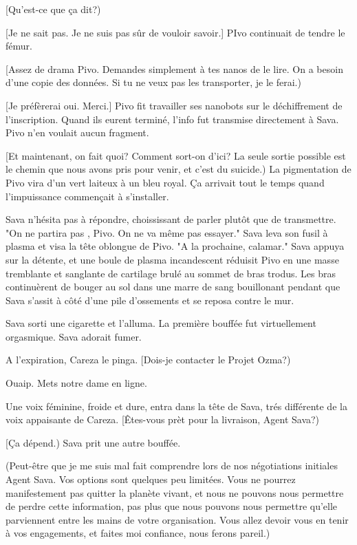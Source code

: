 [Qu'est-ce que ça dit?) 

[Je ne sait pas. Je ne suis pas sûr de vouloir savoir.] PIvo continuait de tendre le fémur. 

[Assez de drama Pivo. Demandes simplement à tes nanos de le lire. On a besoin d'une copie des données. Si tu ne veux pas les transporter, je le ferai.) 

[Je préfèrerai oui. Merci.] Pivo fit travailler ses nanobots  sur le déchiffrement de l'inscription. Quand ils eurent terminé, l'info fut transmise directement à Sava. Pivo n'en voulait aucun fragment. 

[Et maintenant, on fait quoi? Comment sort-on d'ici? La seule sortie possible est le chemin que nous avons pris pour venir, et c'est du suicide.) La pigmentation de Pivo vira d'un vert laiteux à un bleu royal. Ça arrivait tout le temps quand l'impuissance commençait à s'installer. 

Sava n'hésita pas à répondre, choississant de parler plutôt que de transmettre. "On ne partira pas , Pivo. On ne va même pas essayer." Sava leva son fusil à plasma et visa la tête oblongue de Pivo. "A la prochaine, calamar." Sava appuya sur la détente, et une boule de plasma incandescent réduisit Pivo en une masse tremblante et sanglante de  cartilage brulé au sommet de bras trodus. Les bras continuèrent de bouger au sol dans une marre de sang bouillonant pendant que Sava s'assit à côté d'une pile d'ossements et se reposa contre le mur. 

Sava sorti une cigarette et l'alluma. La première bouffée fut virtuellement orgasmique. Sava adorait fumer. 

A l'expiration, Careza le pinga. [Dois-je contacter le Projet Ozma?) 

Ouaip. Mets notre dame en ligne. 

Une voix féminine, froide et dure, entra dans la tête de Sava, trés différente de la voix appaisante de Careza. [Êtes-vous prèt pour la livraison, Agent Sava?) 

[Ça dépend.) Sava prit une autre bouffée. 

(Peut-être que je me suis mal fait comprendre lors de nos négotiations initiales Agent Sava. Vos options sont quelques peu limitées. Vous ne pourrez manifestement pas quitter la planète vivant, et nous ne pouvons nous permettre de perdre cette information, pas plus que nous pouvons nous permettre qu'elle parviennent entre les mains de votre organisation. Vous allez devoir vous en tenir à vos engagements, et faites moi confiance, nous ferons pareil.) 

